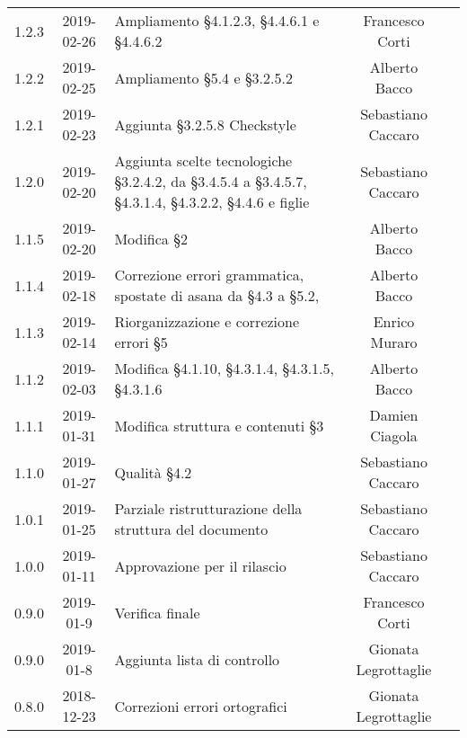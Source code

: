 {\begin{longtable}{ c c C{4cm} c c }
		1.2.3 & 2019-02-26 & Ampliamento §4.1.2.3, §4.4.6.1 e §4.4.6.2 & Francesco Corti & \reda{} \\	
		
		1.2.2 & 2019-02-25 & Ampliamento §5.4 e §3.2.5.2 & Alberto Bacco & \reda{} \\
		
		1.2.1 & 2019-02-23 & Aggiunta §3.2.5.8 Checkstyle & Sebastiano Caccaro & \reda{} \\		
		
		1.2.0 & 2019-02-20 & Aggiunta scelte tecnologiche §3.2.4.2, da §3.4.5.4 a §3.4.5.7, §4.3.1.4, §4.3.2.2, §4.4.6 e figlie & Sebastiano Caccaro & \reda{} \\	
		
		1.1.5 & 2019-02-20 & Modifica §2 & Alberto Bacco & \reda{} \\
		
		1.1.4 & 2019-02-18 & Correzione errori grammatica, spostate di asana da §4.3 a §5.2, & Alberto Bacco & \reda{} \\
		
		1.1.3 & 2019-02-14 & Riorganizzazione e correzione errori §5 & Enrico Muraro & \reda{} \\
		
		1.1.2 & 2019-02-03 & Modifica §4.1.10, §4.3.1.4, §4.3.1.5, §4.3.1.6 & Alberto Bacco& \reda{} \\	
		
		1.1.1 & 2019-01-31 & Modifica struttura e contenuti §3 & Damien Ciagola & \reda{} \\	
		
		1.1.0 & 2019-01-27 & Qualità §4.2 & Sebastiano Caccaro & \reda{} \\	
		
		1.0.1 & 2019-01-25 & Parziale ristrutturazione della struttura del documento & Sebastiano Caccaro & \reda{} \\		
		
		1.0.0 & 2019-01-11 & Approvazione per il rilascio & Sebastiano Caccaro & \Res{} \\
		
		0.9.0 & 2019-01-9 & Verifica finale & Francesco Corti & \ver{} \\
		
		0.9.0 & 2019-01-8 & Aggiunta lista di controllo & Gionata Legrottaglie & \reda{} \\
		
		0.8.0 & 2018-12-23 & Correzioni errori ortografici & Gionata Legrottaglie & \reda{} \\
		

\end{longtable}}
